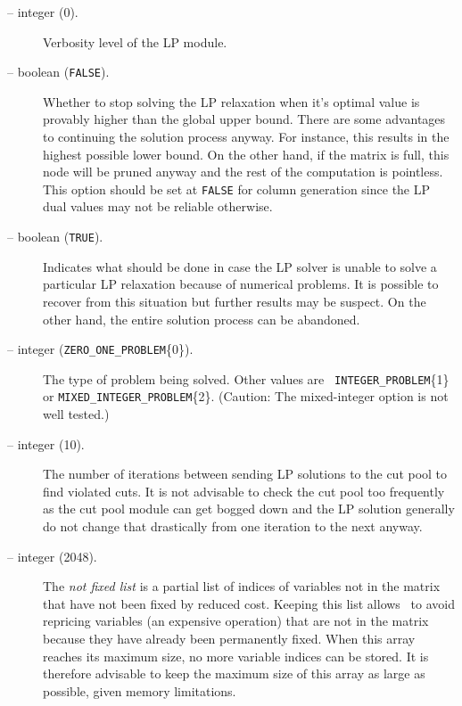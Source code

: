 \begin{description}

\item[ -- integer (0).]
Verbosity level of the LP module.

\item[ -- boolean ({\tt FALSE}).] 
Whether to stop solving the LP relaxation when it's optimal value is
provably higher than the global upper bound. There are some advantages
to continuing the solution process anyway. For instance, this results
in the highest possible lower bound. On the other hand, if the matrix
is full, this node will be pruned anyway and the rest of the
computation is pointless. This option should be set at {\tt FALSE} for
column generation since the LP dual values may not be reliable otherwise.

\item[ -- boolean ({\tt TRUE}).]
Indicates what should be done in case the LP solver is unable to solve
a particular LP relaxation because of numerical problems. It is
possible to recover from this situation but further results may be
suspect. On the other hand, the entire solution process can be
abandoned.

\item[ -- integer ({\tt ZERO\_ONE\_PROBLEM}\{0\}).] 
The type of problem being solved. Other values are {\tt
INTEGER\_PROBLEM}\{1\} or {\tt MIXED\_INTEGER\_PROBLEM}\{2\}.
(Caution: The mixed-integer option is not well tested.)

\item[ -- integer (10).] 
The number of iterations between sending LP solutions to the cut pool
to find violated cuts. It is not advisable to check the cut pool too
frequently as the cut pool module can get bogged down and the LP
solution generally do not change that drastically from one iteration
to the next anyway.

\item[ -- integer (2048).]
The {\em not fixed list} is a partial list of indices of variables not
in the matrix that have not been fixed by reduced cost. Keeping this
list allows \BB\ to avoid repricing variables (an expensive operation)
that are not in the matrix because they have already been permanently
fixed. When this array reaches its maximum size, no more variable
indices can be stored. It is therefore advisable to keep the maximum
size of this array as large as possible, given memory limitations.


\end{description}
